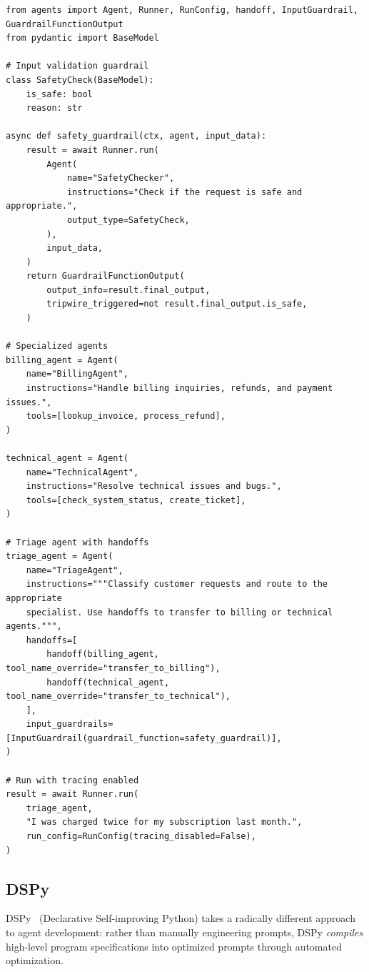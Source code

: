 \begin{lstlisting}[style=pythonstyle, caption={OpenAI Agents SDK with handoffs and guardrails}]
from agents import Agent, Runner, RunConfig, handoff, InputGuardrail, GuardrailFunctionOutput
from pydantic import BaseModel

# Input validation guardrail
class SafetyCheck(BaseModel):
    is_safe: bool
    reason: str

async def safety_guardrail(ctx, agent, input_data):
    result = await Runner.run(
        Agent(
            name="SafetyChecker",
            instructions="Check if the request is safe and appropriate.",
            output_type=SafetyCheck,
        ),
        input_data,
    )
    return GuardrailFunctionOutput(
        output_info=result.final_output,
        tripwire_triggered=not result.final_output.is_safe,
    )

# Specialized agents
billing_agent = Agent(
    name="BillingAgent",
    instructions="Handle billing inquiries, refunds, and payment issues.",
    tools=[lookup_invoice, process_refund],
)

technical_agent = Agent(
    name="TechnicalAgent",
    instructions="Resolve technical issues and bugs.",
    tools=[check_system_status, create_ticket],
)

# Triage agent with handoffs
triage_agent = Agent(
    name="TriageAgent",
    instructions="""Classify customer requests and route to the appropriate
    specialist. Use handoffs to transfer to billing or technical agents.""",
    handoffs=[
        handoff(billing_agent, tool_name_override="transfer_to_billing"),
        handoff(technical_agent, tool_name_override="transfer_to_technical"),
    ],
    input_guardrails=[InputGuardrail(guardrail_function=safety_guardrail)],
)

# Run with tracing enabled
result = await Runner.run(
    triage_agent,
    "I was charged twice for my subscription last month.",
    run_config=RunConfig(tracing_disabled=False),
)
\end{lstlisting}

\subsection{DSPy}
\label{subsubsec:dspy}

DSPy~\cite{khattab2023dspy} (Declarative Self-improving Python) takes a radically different approach to agent development: rather than manually engineering prompts, DSPy \emph{compiles} high-level program specifications into optimized prompts through automated optimization.


